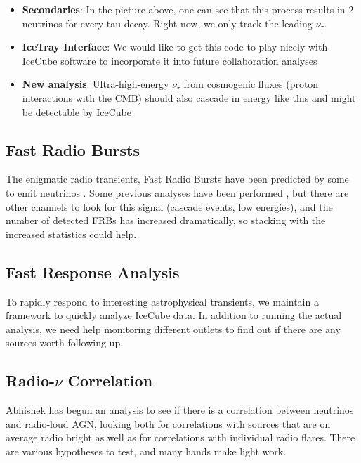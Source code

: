 \begin{itemize}
    \itemsep-1em
    \item \textbf{Secondaries}: In the picture above, one can see that this process results in 2 neutrinos for every tau decay. Right now, we only track the leading $\nu_{\tau}$.
    \item \textbf{IceTray Interface}: We would like to get this code to play nicely with IceCube software to incorporate it into future collaboration analyses
    \item \textbf{New analysis}: Ultra-high-energy $\nu_{\tau}$ from cosmogenic fluxes (proton interactions with the CMB) \cite{Greisen:1966jv, Zatsepin:1966jv, Allison:2018cxu, Ahlers:2010fw, Ahlers:2012rz, Heinze:2019jou, Murase:2015ndr, Murase:2014foa, Fang:2013vla, Boncioli:2018lrv, Biehl:2017hnb} should also cascade in energy like this and might be detectable by IceCube
\end{itemize}

\subsection*{\textbf{Fast Radio Bursts}}
The enigmatic radio transients, Fast Radio Bursts \cite{Lorimer:2018rwi, Keane:2018jqo} have been predicted by some to emit neutrinos \cite{Li:2013kwa}. Some previous analyses have been performed \cite{Aartsen:2019wbt, Aartsen:2017zvw, Fahey:2016czk}, but there are other channels to look for this signal (cascade events, low energies), and the number of detected FRBs has increased dramatically, so stacking with the increased statistics could help.

\subsection*{\textbf{Fast Response Analysis}}
To rapidly respond to interesting astrophysical transients, we maintain a framework to quickly analyze IceCube data. In addition to running the actual analysis, we need help monitoring different outlets to find out if there are any sources worth following up.

\subsection*{\textbf{Radio-$\nu$ Correlation}}
Abhishek has begun an analysis to see if there is a correlation between neutrinos and radio-loud AGN, looking both for correlations with sources that are on average radio bright as well as for correlations with individual radio flares. There are various hypotheses to test, and many hands make light work.

